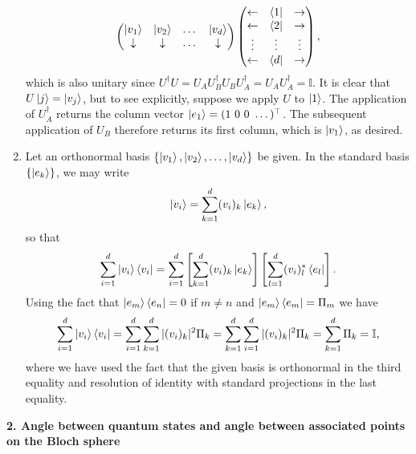 \documentclass{article}
\theoremstyle{definition}
\newcommand{\lb}{\left[}
\newcommand{\rb}{\right]}
\begin{document}
\begin{enumerate}[label=(\alph*)]
\begin{align*}
\begin{pmatrix}
			\ket{v_1}& \ket{v_2}& \dots & \ket{v_d}\\
			\downarrow& \downarrow& \dots&\downarrow 
		\end{pmatrix} 
	\begin{pmatrix}
		\leftarrow & \bra{1} &\rightarrow \\
		\leftarrow & \bra{2} &\rightarrow \\
		\vdots & \vdots &\vdots \\
		\leftarrow & \bra{d} &\rightarrow 
	\end{pmatrix},
	\end{align*}
	which is also unitary since $U^\dagger U = U_A U_B^\dagger U_B U_A^\dagger = U_AU_A^\dagger = \mathbb{I}$. It is clear that $U\ket{j} = \ket{v_j}$, but to see explicitly, suppose we apply $U$ to $\ket{1}$. The application of $U_A^\dagger$ returns the column vector $\ket{e_1} = (1\,\, 0 \,\,0 \,\, \dots)^\top$. The subsequent application of $U_B$ therefore returns its first column, which is $\ket{v_1}$, as desired. 

	
	
	\item Let an orthonormal basis $\{ \ket{v_1},\ket{v_2},\dots,\ket{v_d} \}$ be given. In the standard basis $\{\ket{e_k}\}$, we may write
	\begin{align*}
		\ket{v_i} = \sum_{k=1}^d (v_i)_k \ket{e_k},
	\end{align*}
	so that
	\begin{align*}
		\sum_{i=1}^d \ket{v_i} \bra{v_i} = \sum_{i=1}^d \lb \sum_{k=1}^d (v_i)_k \ket{e_k}  \rb \lb \sum_{l=1}^d (v_i)^*_l \bra{e_l} \rb. 
	\end{align*}
	Using the fact that $\ket{e_m}\bra{e_n} = 0$ if $m\neq n$ and $\ket{e_m}\bra{e_m} = \Pi_m$ we have
	\begin{align*}
		\sum_{i=1}^d \ket{v_i} \bra{v_i} = \sum_{i=1}^d \sum_{k=1}^d  |(v_i)_k|^2 \Pi_k = \sum_{k=1}^d \sum_{i=1}^d  |(v_i)_k|^2 \Pi_k = \sum_{k=1}^d\Pi_k = \mathbb{I},
	\end{align*}
	where we have used the fact that the given basis is orthonormal in the third equality and resolution of identity with standard projections in the last equality. 
	
\end{enumerate}



\noindent \textbf{2. Angle between quantum states and angle between associated points on the Bloch sphere} 
\end{document}
